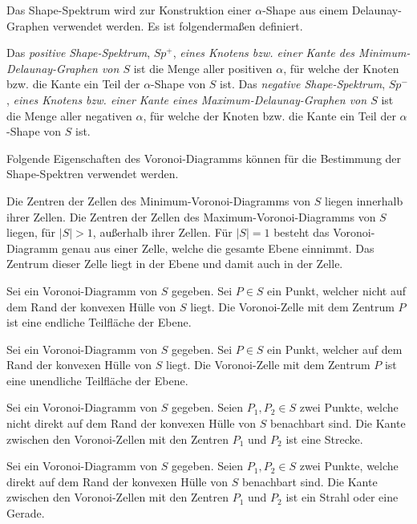 Das Shape-Spektrum wird zur Konstruktion einer $\alpha$-Shape aus einem Delaunay-Graphen verwendet werden. Es ist folgendermaßen definiert.

\begin{defin}
Das \emph{positive Shape-Spektrum}, $Sp^+$, \emph{eines Knotens bzw. einer Kante des Minimum-Delaunay-Graphen von $S$} ist die Menge aller positiven $\alpha$, für welche der Knoten bzw. die Kante ein Teil der $\alpha$-Shape von $S$ ist.
Das \emph{negative Shape-Spektrum}, $Sp^-$, \emph{eines Knotens bzw. einer Kante eines Maximum-Delaunay-Graphen von $S$} ist die Menge aller negativen $\alpha$, für welche der Knoten bzw. die Kante ein Teil der $\alpha$-Shape von $S$ ist.
\end{defin}

Folgende Eigenschaften des Voronoi-Diagramms können für die Bestimmung der Shape-Spektren verwendet werden.

\begin{eigen}
Die Zentren der Zellen des Minimum-Voronoi-Diagramms von $S$ liegen innerhalb ihrer Zellen. Die Zentren der Zellen des Maximum-Voronoi-Diagramms von $S$ liegen, für $\mid S \mid > 1$, außerhalb ihrer Zellen. Für $\mid S \mid = 1$ besteht das Voronoi-Diagramm genau aus einer Zelle, welche die gesamte Ebene einnimmt. Das Zentrum dieser Zelle liegt in der Ebene und damit auch in der Zelle. 
\end{eigen}

\begin{eigen}
Sei ein Voronoi-Diagramm von $S$ gegeben. Sei $P \in S$ ein Punkt, welcher nicht auf dem Rand der konvexen Hülle von $S$ liegt. Die Voronoi-Zelle mit dem Zentrum $P$ ist eine endliche Teilfläche der Ebene.
\end{eigen}

\begin{eigen}
Sei ein Voronoi-Diagramm von $S$ gegeben. Sei $P \in S$ ein Punkt, welcher auf dem Rand der konvexen Hülle von $S$ liegt. Die Voronoi-Zelle mit dem Zentrum $P$ ist eine unendliche Teilfläche der Ebene.
\end{eigen}

\begin{eigen}
Sei ein Voronoi-Diagramm von $S$ gegeben. Seien $P_1,P_2 \in S$ zwei Punkte, welche nicht direkt auf dem Rand der konvexen Hülle von $S$ benachbart sind. Die Kante zwischen den Voronoi-Zellen mit den Zentren $P_1$ und $P_2$ ist eine Strecke.
\end{eigen}

\begin{eigen}
Sei ein Voronoi-Diagramm von $S$ gegeben. Seien $P_1,P_2 \in S$ zwei Punkte, welche direkt auf dem Rand der konvexen Hülle von $S$ benachbart sind. Die Kante zwischen den Voronoi-Zellen mit den Zentren $P_1$ und $P_2$ ist ein Strahl oder eine Gerade.
\end{eigen}

